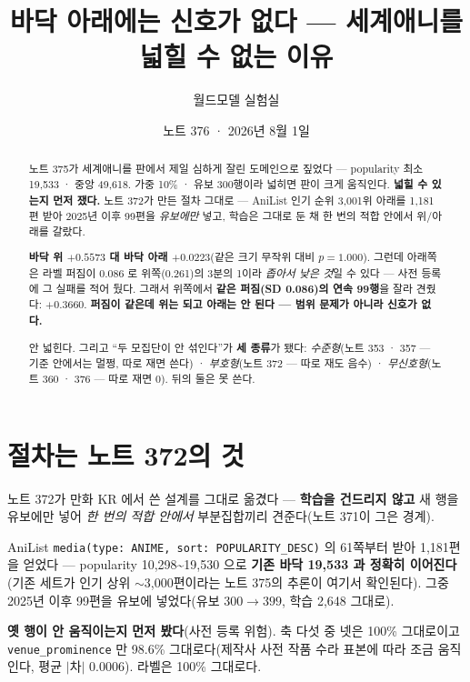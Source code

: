 \documentclass[11pt]{article}
\begin{document}
\title{바닥 아래에는 신호가 없다 --- 세계애니를 넓힐 수 없는 이유}
\author{월드모델 실험실}
\date{노트 376 · 2026년 8월 1일}
\maketitle

\begin{abstract}
노트 375가 세계애니를 판에서 제일 심하게 잘린 도메인으로 짚었다 ---
popularity 최소 19,533 · 중앙 49,618. 가중 10\% · 유보 300행이라 넓히면
판이 크게 움직인다. \textbf{넓힐 수 있는지 먼저 쟀다.} 노트 372가 만든
절차 그대로 --- AniList 인기 순위 3,001위 아래를 1,181편 받아 2025년 이후
99편을 \emph{유보에만} 넣고, 학습은 그대로 둔 채 한 번의 적합 안에서
위/아래를 갈랐다.

\textbf{바닥 위 $+0.5573$ 대 바닥 아래 $\mathbf{+0.0223}$}(같은 크기
무작위 대비 $p=1.000$). 그런데 아래쪽은 라벨 퍼짐이 0.086 로 위쪽(0.261)의
3분의 1이라 \emph{좁아서 낮은 것}일 수 있다 --- 사전 등록에 그 실패를 적어
뒀다. 그래서 위쪽에서 \textbf{같은 퍼짐(SD 0.086)의 연속 99행}을 잘라
견줬다: \textbf{$+0.3660$}. \textbf{퍼짐이 같은데 위는 되고 아래는 안 된다
--- 범위 문제가 아니라 신호가 없다.}

안 넓힌다. 그리고 ``두 모집단이 안 섞인다''가 \textbf{세 종류}가 됐다:
\emph{수준형}(노트 353 · 357 --- 기준 안에서는 멀쩡, 따로 재면 쓴다) ·
\emph{부호형}(노트 372 --- 따로 재도 음수) · \emph{무신호형}(노트 360 ·
376 --- 따로 재면 0). 뒤의 둘은 못 쓴다.
\end{abstract}

\section{절차는 노트 372의 것}

노트 372가 만화 KR 에서 쓴 설계를 그대로 옮겼다 --- \textbf{학습을
건드리지 않고} 새 행을 유보에만 넣어 \emph{한 번의 적합 안에서} 부분집합끼리
견준다(노트 371이 그은 경계).

AniList \texttt{media(type: ANIME, sort: POPULARITY\_DESC)} 의 61쪽부터
받아 1,181편을 얻었다 --- popularity 10,298\textasciitilde{}19,530 으로
\textbf{기존 바닥 19,533 과 정확히 이어진다}(기존 세트가 인기 상위
$\sim$3,000편이라는 노트 375의 추론이 여기서 확인된다). 그중 2025년 이후
99편을 유보에 넣었다(유보 $300 \to 399$, 학습 2,648 그대로).

\textbf{옛 행이 안 움직이는지 먼저 봤다}(사전 등록 위험). 축 다섯 중 넷은
100\% 그대로이고 \texttt{venue\_prominence} 만 98.6\% 그대로다(제작사 사전
작품 수라 표본에 따라 조금 움직인다, 평균 $|$차$|$ 0.0006). 라벨은 100\%
그대로다.
\end{document}
